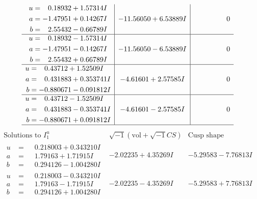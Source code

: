 \documentclass[1p]{elsarticle_modified}
\theoremstyle{definition}
\newcommand{\I}{\sqrt{-1}}
\begin{document}
$$\begin{array}{c|c|c}
\begin{aligned}
u &= \phantom{-}0.18932 + 1.57314 I \\
a &= -1.47951 + 0.14267 I \\
b &= \phantom{-}2.55432 - 0.66789 I\end{aligned}
 & -11.56050 + 6.53889 I & \phantom{-0.000000 } 0 \\ \hline\begin{aligned}
u &= \phantom{-}0.18932 - 1.57314 I \\
a &= -1.47951 - 0.14267 I \\
b &= \phantom{-}2.55432 + 0.66789 I\end{aligned}
 & -11.56050 - 6.53889 I & \phantom{-0.000000 } 0 \\ \hline\begin{aligned}
u &= \phantom{-}0.43712 + 1.52509 I \\
a &= \phantom{-}0.431883 + 0.353741 I \\
b &= -0.880671 - 0.091812 I\end{aligned}
 & -4.61601 + 2.57585 I & \phantom{-0.000000 } 0 \\ \hline\begin{aligned}
u &= \phantom{-}0.43712 - 1.52509 I \\
a &= \phantom{-}0.431883 - 0.353741 I \\
b &= -0.880671 + 0.091812 I\end{aligned}
 & -4.61601 - 2.57585 I & \phantom{-0.000000 } 0\\
 \hline 
 \end{array}$$\newpage$$\begin{array}{c|c|c}  
\text{Solutions to }I^u_{1}& \I (\text{vol} + \sqrt{-1}CS) & \text{Cusp shape}\\
 \hline 
\begin{aligned}
u &= \phantom{-}0.218003 + 0.343210 I \\
a &= \phantom{-}1.79163 + 1.71915 I \\
b &= \phantom{-}0.294126 - 1.004280 I\end{aligned}
 & -2.02235 + 4.35269 I & -5.29583 - 7.76813 I \\ \hline\begin{aligned}
u &= \phantom{-}0.218003 - 0.343210 I \\
a &= \phantom{-}1.79163 - 1.71915 I \\
b &= \phantom{-}0.294126 + 1.004280 I\end{aligned}
 & -2.02235 - 4.35269 I & -5.29583 + 7.76813 I \\ \hline\begin{aligned}

\end{aligned}
\end{array}$$
\end{document}
